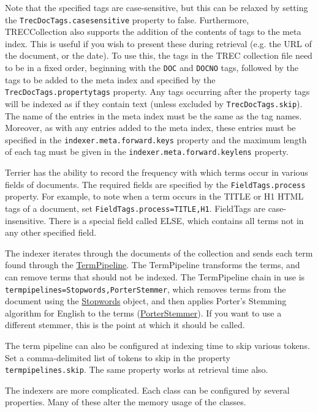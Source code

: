 Note that the specified tags are case-sensitive, but this can be relaxed
by setting the \texttt{TrecDocTags.casesensitive} property to false.
Furthermore, TRECCollection also supports the addition of the contents
of tags to the meta index. This is useful if you wish to present these
during retrieval (e.g. the URL of the document, or the date). To use
this, the tags in the TREC collection file need to be in a fixed order,
beginning with the \texttt{DOC} and \texttt{DOCNO} tags, followed by the
tags to be added to the meta index and specified by the
\texttt{TrecDocTags.propertytags} property. Any tags occurring after the
property tags will be indexed as if they contain text (unless excluded
by \texttt{TrecDocTags.skip}). The name of the entries in the meta index
must be the same as the tag names. Moreover, as with any entries added
to the meta index, these entries must be specified in the
\texttt{indexer.meta.forward.keys} property and the maximum length of
each tag must be given in the \texttt{indexer.meta.forward.keylens}
property.

\href{}{}

Terrier has the ability to record the frequency with which terms occur
in various fields of documents. The required fields are specified by the
\texttt{FieldTags.process} property. For example, to note when a term
occurs in the TITLE or H1 HTML tags of a document, set
\texttt{FieldTags.process=TITLE,H1}. FieldTags are case-insensitive.
There is a special field called ELSE, which contains all terms not in
any other specified field.

The indexer iterates through the documents of the collection and sends
each term found through the
\href{javadoc/org/terrier/terms/TermPipeline.html}{TermPipeline}. The
TermPipeline transforms the terms, and can remove terms that should not
be indexed. The TermPipeline chain in use is
\texttt{termpipelines=Stopwords,PorterStemmer}, which removes terms from
the document using the
\href{javadoc/org/terrier/terms/Stopwords.html}{Stopwords} object, and
then applies Porter's Stemming algorithm for English to the terms
(\href{javadoc/org/terrier/terms/PorterStemmer.html}{PorterStemmer}). If
you want to use a different stemmer, this is the point at which it
should be called.

The term pipeline can also be configured at indexing time to skip
various tokens. Set a comma-delimited list of tokens to skip in the
property \texttt{termpipelines.skip}. The same property works at
retrieval time also.

The indexers are more complicated. Each class can be configured by
several properties. Many of these alter the memory usage of the classes.

